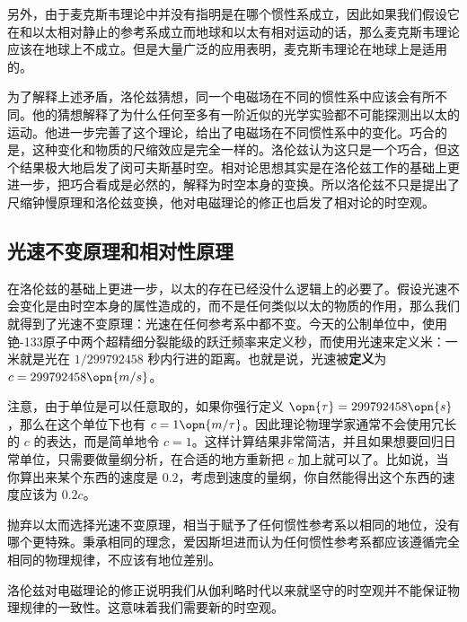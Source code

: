 另外，由于麦克斯韦理论中并没有指明是在哪个惯性系成立，因此如果我们假设它在和以太相对静止的参考系成立而地球和以太有相对运动的话，那么麦克斯韦理论应该在地球上不成立。但是大量广泛的应用表明，麦克斯韦理论在地球上是适用的。

为了解释上述矛盾，洛伦兹猜想，同一个电磁场在不同的惯性系中应该会有所不同。他的猜想解释了为什么任何至多有一阶近似的光学实验都不可能探测出以太的运动。他进一步完善了这个理论，给出了电磁场在不同惯性系中的变化。巧合的是，这种变化和物质的尺缩效应是完全一样的。洛伦兹认为这只是一个巧合，但这个结果极大地启发了闵可夫斯基时空。相对论思想其实是在洛伦兹工作的基础上更进一步，把巧合看成是必然的，解释为时空本身的变换。所以洛伦兹不只是提出了尺缩钟慢原理和洛伦兹变换，他对电磁理论的修正也启发了相对论的时空观。

\subsection{光速不变原理和相对性原理}

在洛伦兹的基础上更进一步，以太的存在已经没什么逻辑上的必要了。假设光速不会变化是由时空本身的属性造成的，而不是任何类似以太的物质的作用，那么我们就得到了光速不变原理：光速在任何参考系中都不变。今天的公制单位中，使用铯-133原子中两个超精细分裂能级的跃迁频率来定义秒，而使用光速来定义米：一米就是光在 $1/299792458$ 秒内行进的距离。也就是说，光速被\textbf{定义}为 $c=299792458\opn{m/s}$。

注意，由于单位是可以任意取的，如果你强行定义 $\opn{\tau}=299792458\opn{s}$，那么在这个单位下也有 $c=1\opn{m/\tau}$。因此理论物理学家通常不会使用冗长的 $c$ 的表达，而是简单地令 $c=1$。这样计算结果非常简洁，并且如果想要回归日常单位，只需要做量纲分析，在合适的地方重新把 $c$ 加上就可以了。比如说，当你算出来某个东西的速度是 $0.2$，考虑到速度的量纲，你自然能得出这个东西的速度应该为 $0.2c$。

抛弃以太而选择光速不变原理，相当于赋予了任何惯性参考系以相同的地位，没有哪个更特殊。秉承相同的理念，爱因斯坦进而认为任何惯性参考系都应该遵循完全相同的物理规律，不应该有地位差别。

洛伦兹对电磁理论的修正说明我们从伽利略时代以来就坚守的时空观并不能保证物理规律的一致性。这意味着我们需要新的时空观。




